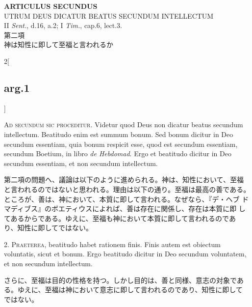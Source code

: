 \documentclass[paper=a4paper,fontsize=10pt,jafontsize=9pt,titlepage]{jlreq}
\begin{document}
\newpage
{}
{}
\setcounter{section}{2}
\setcounter{subsection}{0}


\begin{center}
 {\Large {\bfseries ARTICULUS SECUNDUS}}\\
 {\large UTRUM DEUS DICATUR BEATUS SECUNDUM INTELLECTUM}\\
 {\footnotesize II {\itshape Sent.}, d.16, a.2; I {\itshape Tim.},
 cap.6, lect.3.}\\
 {\Large 第二項\\神は知性に即して至福と言われるか}
\end{center}

\begin{paracol}{2}[\subsection{arg.1}]

{\Huge A}{\scshape d secundum sic proceditur}. Videtur quod Deus non dicatur beatus
secundum intellectum. Beatitudo enim est summum bonum. Sed bonum dicitur
in Deo secundum essentiam, quia bonum respicit esse, quod est secundum
essentiam, secundum Boetium, in libro {\itshape de Hebdomad}. Ergo et beatitudo
dicitur in Deo secundum essentiam, et non secundum intellectum.

\switchcolumn

第二項の問題へ、議論は以下のように進められる。神は、知性において、至福
と言われるのではないと思われる。理由は以下の通り。至福は最高の善である。
ところが、善は、神において、本質に即して言われる。なぜなら、『デ・ヘブ
ドマディブス』のボエティウスによれば、善は存在に関係し、存在は本質に即
してあるからである。ゆえに、至福も神において本質に即して言われるのであ
り、知性に即してではない。


2. {\scshape Praeterea}, beatitudo habet rationem finis. Finis autem est obiectum
voluntatis, sicut et bonum. Ergo beatitudo dicitur in Deo secundum
voluntatem, et non secundum intellectum.

\switchcolumn

さらに、至福は目的の性格を持つ。しかし目的は、善と同様、意志の対象であ
る。ゆえに、至福は神において意志に即して言われるのであり、知性に即して
ではない。


\end{paracol}
\end{document}
